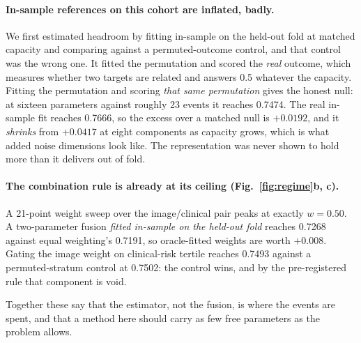 \documentclass[11pt]{article}
\begin{document}
\paragraph{In-sample references on this cohort are inflated, badly.} We first estimated headroom by
fitting in-sample on the held-out fold at matched capacity and comparing against a permuted-outcome
control, and that control was the wrong one. It fitted the permutation and scored the
\emph{real} outcome, which measures whether two targets are related and answers 0.5 whatever the
capacity. Fitting the permutation and scoring \emph{that same permutation} gives the honest null:
at sixteen parameters against roughly 23 events it reaches 0.7474. The real in-sample fit
reaches 0.7666, so the excess over a matched null is $+0.0192$, and it \emph{shrinks} from $+0.0417$
at eight components as capacity grows, which is what added noise dimensions look like. The
representation was never shown to hold more than it delivers out of fold.

\paragraph{The combination rule is already at its ceiling (Fig.~\ref{fig:regime}b, c).} A 21-point weight sweep over the
image/clinical pair peaks at exactly $w=0.50$. A two-parameter fusion \emph{fitted in-sample on the
held-out fold} reaches 0.7268 against equal weighting's 0.7191, so oracle-fitted weights are
worth $+0.008$. Gating the image weight on clinical-risk tertile reaches 0.7493 against a
permuted-stratum control at 0.7502: the control wins, and by the pre-registered rule that
component is void.

Together these say that the estimator, not the fusion, is where the events are spent, and that a
method here should carry as few free parameters as the problem allows.
\end{document}
